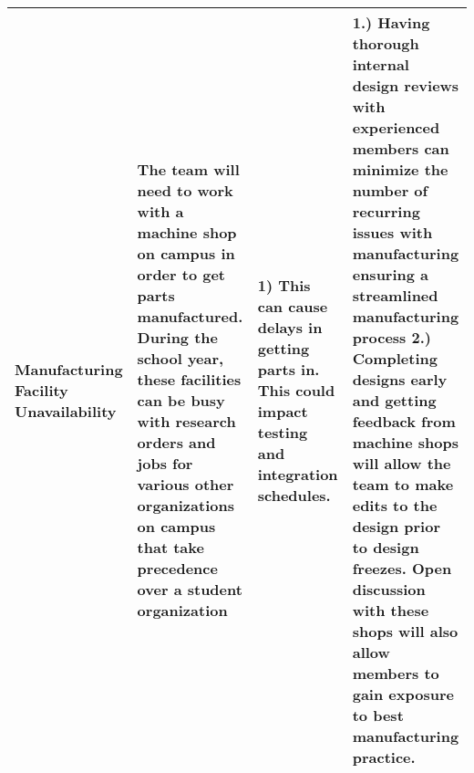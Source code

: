 \begin{table}[H]
{\begin{tabularx}{\linewidth}{XXXX}
    Manufacturing Facility Unavailability & The team will need to work with a machine shop on campus in order to get parts manufactured. During the school year, these facilities can be busy with research orders and jobs for various other organizations on campus that take precedence over a student organization & 1) This can cause delays in getting parts in. This could impact testing and integration schedules. & 1.) Having thorough internal design reviews with experienced members can minimize the number of recurring issues with manufacturing ensuring a streamlined manufacturing process 2.) Completing designs early and getting feedback from machine shops will allow the team to make edits to the design prior to design freezes. Open discussion with these shops will also allow members to gain exposure to best manufacturing practice. \\ \bottomrule
    \bottomrule
    \end{tabularx}
    }
\end{table}

